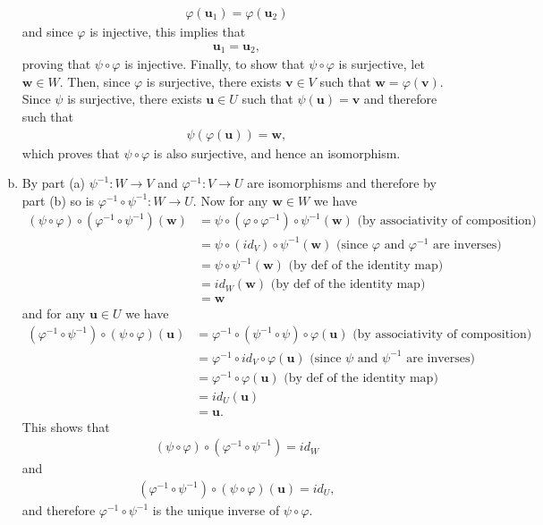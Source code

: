 \documentclass[12pt,letterpaper,reqno]{article}
\numberwithin{equation}{section}
\newcommand{\bu}{\mathbf{u}}
\begin{document}
\begin{pf}
\begin{enumerate}[(a)]
\begin{align*}
		\varphi(\mathbf{u}_1)=\varphi(\mathbf{u}_2)
	\end{align*}
	and since $\varphi$ is injective, this implies that 
	\begin{align*}
		\mathbf{u}_1=\mathbf{u}_2,
	\end{align*}
	proving that $\psi \circ \varphi$ is injective. Finally, to show that $\psi \circ \varphi$ is surjective, let $\mathbf{w} \in W$. Then, since $\varphi$ is surjective, there exists $\mathbf{v} \in V$ such that $\mathbf{w}=\varphi(\mathbf{v})$. Since $\psi$ is surjective, there exists $\mathbf{u} \in U$ such that $\psi(\mathbf{u})=\mathbf{v}$ and therefore such that 
	\begin{align*}
		\psi(\varphi(\mathbf{u}))=\mathbf{w},
	\end{align*}
	which proves that $\psi \circ \varphi$ is also surjective, and hence an isomorphism.
	\item By part (a) $\psi^{-1}:W \to V$ and $\varphi^{-1}: V \to U$ are isomorphisms and therefore by part (b) so is $\varphi^{-1} \circ \psi^{-1}:W \to U$. Now for any $\mathbf{w} \in W$ we have
	\begin{align*}
	(\psi \circ \varphi) \circ (\varphi^{-1} \circ \psi^{-1})(\mathbf{w})&=\psi \circ (\varphi \circ \varphi^{-1}) \circ \psi^{-1}(\mathbf{w}) \text{ (by associativity of composition)} \\
	&=\psi \circ (id_V) \circ \psi^{-1}(\mathbf{w}) \text{ (since $\varphi$ and $\varphi^{-1}$ are inverses)} \\
	&=\psi \circ \psi^{-1}(\mathbf{w}) \text{ (by def of the identity map)}\\
	&=id_W(\mathbf{w}) \text{ (by def of the identity map)}\\
	&=\mathbf{w}
	\end{align*}
and for any $\bu \in U$ we have
\begin{align*}
	 (\varphi^{-1} \circ \psi^{-1}) \circ (\psi \circ \varphi)(\bu)&=\varphi^{-1} \circ (\psi^{-1} \circ \psi) \circ \varphi(\bu) \text{ (by associativity of composition)}\\
	 &=\varphi^{-1} \circ id_V \circ \varphi(\bu) \text{ (since $\psi$ and $\psi^{-1}$ are inverses)}\\
	 &=\varphi^{-1} \circ \varphi(\bu) \text{ (by def of the identity map)}\\
	 &=id_U(\bu) \\
	 &=\bu.
\end{align*}
This shows that 
\begin{align*}
	(\psi \circ \varphi) \circ (\varphi^{-1} \circ \psi^{-1})=id_W
\end{align*}
and 
\begin{align*}
	(\varphi^{-1} \circ \psi^{-1}) \circ (\psi \circ \varphi)(\bu)=id_U,
\end{align*}
and therefore $\varphi^{-1} \circ \psi^{-1}$
is the unique inverse of $\psi \circ \varphi$.
\end{enumerate}	
\end{pf}
\end{document}
